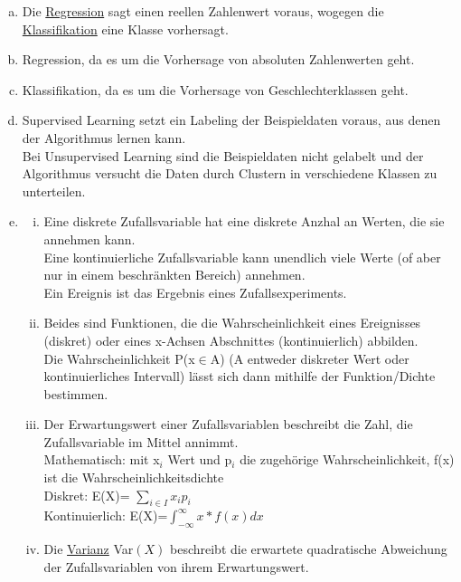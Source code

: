 \begin{aufgabe}
\end{aufgabe}
\begin{enumerate}[a)]
	\item Die \underline{Regression} sagt einen reellen Zahlenwert voraus, wogegen die \underline{Klassifikation} eine Klasse vorhersagt.
	\item Regression, da es um die Vorhersage von absoluten Zahlenwerten geht.
	\item Klassifikation, da es um die Vorhersage von Geschlechterklassen geht.
	\item Supervised Learning setzt ein Labeling der Beispieldaten voraus, aus denen der Algorithmus lernen kann. \\
	Bei Unsupervised Learning sind die Beispieldaten nicht gelabelt und der Algorithmus versucht die Daten durch Clustern in verschiedene Klassen zu unterteilen.
	\item
	\begin{enumerate}[i)]
		\item Eine diskrete Zufallsvariable hat eine diskrete Anzhal an Werten, die sie annehmen kann.\\
		Eine kontinuierliche Zufallsvariable kann unendlich viele Werte (of aber nur in einem beschränkten Bereich) annehmen.\\
		Ein Ereignis ist das Ergebnis eines Zufallsexperiments.
		\item Beides sind Funktionen, die die Wahrscheinlichkeit eines Ereignisses (diskret) oder eines x-Achsen Abschnittes (kontinuierlich) abbilden. \\
		Die Wahrscheinlichkeit P(x$\in$A) (A entweder diskreter Wert oder kontinuierliches Intervall) lässt sich dann mithilfe der Funktion/Dichte bestimmen.
		\item Der Erwartungswert einer Zufallsvariablen beschreibt die Zahl, die Zufallsvariable im Mittel annimmt.\\
		Mathematisch: mit x$_i$ Wert und p$_i$ die zugehörige Wahrscheinlichkeit, f(x) ist die Wahrscheinlichkeitsdichte\\
		Diskret: E(X)= $\sum_{i\in I}^{} x_ip_i$\\
		Kontinuierlich: E(X)=$\int^{\infty}_{-\infty}x*f(x) dx$\\
		\item Die \underline{Varianz} Var$(X)$ beschreibt die erwartete quadratische Abweichung der Zufallsvariablen von ihrem Erwartungswert.
		\begin{align*}

\end{align*}
\end{enumerate}
\end{enumerate}
